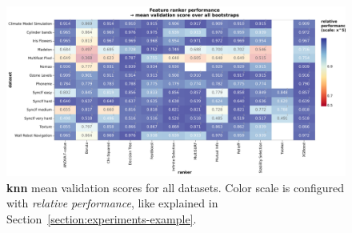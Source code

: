 \documentclass[../main.tex]{subfiles}
\begin{document}
\begin{figure}[ht]
    \centering
    \includegraphics[width=\linewidth]{report/images/results-all-datasets-mean-validation-knn.pdf}
    \caption{\textbf{\gls{knn}} mean validation scores for all datasets. Color scale is configured with \textit{relative performance}, like explained in Section~\ref{section:experiments-example}.}
    \label{fig:results-all-datasets-mean-validation-knn}
\end{figure}


\biblio
\end{document}
